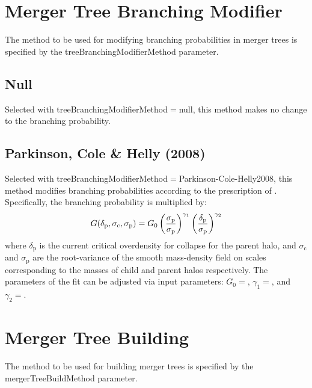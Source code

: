 \section{Merger Tree Branching Modifier}

The method to be used for modifying branching probabilities in merger trees is specified by the {\normalfont \ttfamily treeBranchingModifierMethod} parameter.

\subsection{Null}

Selected with {\normalfont \ttfamily treeBranchingModifierMethod}$=${\normalfont \ttfamily null}, this method makes no change to the branching probability.

\subsection{Parkinson, Cole \& Helly (2008)}

Selected with {\normalfont \ttfamily treeBranchingModifierMethod}$=${\normalfont \ttfamily Parkinson-Cole-Helly2008}, this method modifies branching probabilities according to the prescription of \cite{parkinson_generating_2008}. Specifically, the branching probability is multiplied by:
\begin{equation}
 G(\delta_{\mathrm p},\sigma_{\mathrm c},\sigma_{\mathrm p}) = G_0 \left({\sigma_{\mathrm p}\over\sigma_{\mathrm p}}\right)^{\gamma_1} \left({\delta_{\mathrm p}\over\sigma_{\mathrm p}}\right)^{\gamma_2}
\end{equation}
where $\delta_{\mathrm p}$ is the current critical overdensity for collapse for the parent halo, and $\sigma_{\mathrm c}$ and $\sigma_{\mathrm p}$ are the root-variance of the smooth mass-density field on scales corresponding to the masses of child and parent halos respectively. The parameters of the fit can be adjusted via input parameters: $G_0=${\normalfont \ttfamily [modifiedPressSchechterG0]}, $\gamma_1=${\normalfont \ttfamily [modifiedPressSchechterGamma1]}, and $\gamma_2=${\normalfont \ttfamily [modifiedPressSchechterGamma2]}.

\section{Merger Tree Building}

The method to be used for building merger trees is specified by the {\normalfont \ttfamily mergerTreeBuildMethod} parameter.

